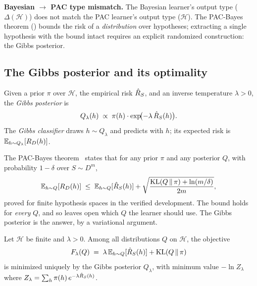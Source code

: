 \begin{obstbox}
\textbf{Bayesian $\to$ PAC type mismatch.} The Bayesian learner's output type ($\Delta(\mathcal{H})$) does not match the PAC learner's output type ($\mathcal{H}$). The PAC-Bayes theorem () bounds the risk of a \emph{distribution} over hypotheses; extracting a single hypothesis with the bound intact requires an explicit randomized construction: the Gibbs posterior.
\end{obstbox}

\subsection{The Gibbs posterior and its optimality}

\begin{defn}
\label{def:gibbs-posterior}
Given a prior $\pi$ over $\mathcal{H}$, the empirical risk $\hat{R}_S$, and an inverse temperature $\lambda > 0$, the \emph{Gibbs posterior} is
\[
Q_\lambda(h) \;\propto\; \pi(h) \cdot \exp\!\bigl(-\lambda \,\hat{R}_S(h)\bigr).
\]
The \emph{Gibbs classifier} draws $h \sim Q_\lambda$ and predicts with $h$; its expected risk is $\mathbb{E}_{h \sim Q_\lambda}[R_D(h)]$.
\end{defn}

The PAC-Bayes theorem~\cite{McAllester1999} states that for any prior $\pi$ and any posterior $Q$, with probability $1 - \delta$ over $S \sim D^m$,
\[
\mathbb{E}_{h \sim Q}[R_D(h)] \;\leq\; \mathbb{E}_{h \sim Q}[\hat{R}_S(h)] + \sqrt{\frac{\mathrm{KL}(Q \,\|\, \pi) + \ln(m/\delta)}{2m}},
\]
proved for finite hypothesis spaces in the verified development. The bound holds for \emph{every} $Q$, and so leaves open which $Q$ the learner should use. The Gibbs posterior is the answer, by a variational argument.

\begin{prop}
\label{prop:gibbs-variational}
Let $\mathcal{H}$ be finite and $\lambda > 0$. Among all distributions $Q$ on $\mathcal{H}$, the objective
\[
F_\lambda(Q) \;=\; \lambda\,\mathbb{E}_{h \sim Q}[\hat{R}_S(h)] + \mathrm{KL}(Q \,\|\, \pi)
\]
is minimized uniquely by the Gibbs posterior $Q_\lambda$, with minimum value $-\ln Z_\lambda$ where $Z_\lambda = \sum_{h} \pi(h)\,e^{-\lambda \hat{R}_S(h)}$.
\end{prop}

